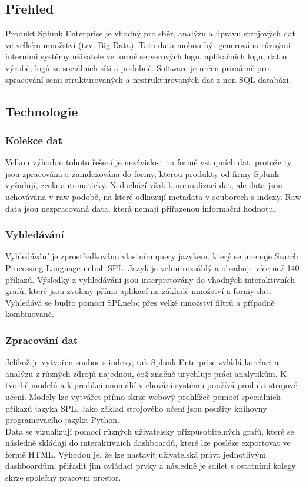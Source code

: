 \documentclass[czech,BP]{thesiskiv}
\begin{document}
\subsection{Přehled}
Produkt Splunk Enterprise je vhodný pro sběr, analýzu a úpravu strojových dat ve velkém množství (tzv. Big Data). Tato data mohou být generována různými interními systémy uživatele ve formě serverových logů, aplikačních logů, dat o výrobě, logů ze sociálních sítí a podobně. Software je určen primárně pro zpracování semi-strukturovaných a nestrukturovaných dat z non-SQL databází.
\subsection{Technologie}
\subsubsection{Kolekce dat}
Velkou výhodou tohoto řešení je nezávislost na formě vstupních dat, protože ty jsou zpracována a zaindexována do formy, kterou produkty od firmy Splunk vyžadují, zcela automaticky. Nedochází však k normalizaci dat, ale data jsou uchovávána v raw podobě, na které odkazují metadata v souborech s indexy. Raw data jsou nezpracovaná data, která nemají přiřazenou informační hodnotu.
\subsubsection{Vyhledávání}
Vyhledávání je zprostředkováno vlastním query jazykem, který se jmenuje Search Processing Language neboli SPL\texttrademark. Jazyk je velmi rozsáhlý a obsahuje více než 140 příkazů. Výsledky z vyhledávání jsou interpretovány do vhodných interaktivních grafů, které jsou zvoleny přímo aplikací na základě množství a formy dat. Vyhledává se buďto pomocí SPL\texttrademark nebo přes velké množství filtrů a případně kombinovaně. \cite{Operational_intelligence}
\subsubsection{Zpracování dat}
Jelikož je vytvořen soubor s indexy, tak Splunk Enterprise zvládá korelaci a analýzu z různých zdrojů najednou, což značně urychluje práci analytikům. K tvorbě modelů a k predikci anomálií v chování systému používá produkt strojové učení. Modely lze vytvářet přímo skrze webový prohlížeč pomocí speciálních příkazů jazyka SPL\texttrademark. Jako základ strojového učení jsou použity knihovny programovacího jazyka Python. \cite{MachineLearning}
\\
Data se vizualizují pomocí různých uživatelsky přizpůsobitelných grafů, které se následně skládají do interaktivních dashboardů, které lze posléze exportovat ve formě HTML. Výhodou je, že lze nastavit uživatelská práva jednotlivým dashboardům, přiřadit jim ovládací prvky a následně je sdílet s ostatními kolegy skrze společný pracovní prostor.
\end{document}

